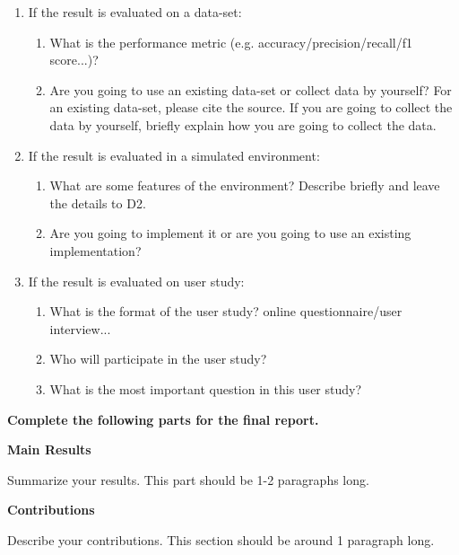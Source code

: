 \documentclass[letterpaper]{article} %
\begin{document}
\begin{enumerate}
  \item If the result is evaluated on a data-set:
    \begin{enumerate}
      \item What is the performance metric (e.g. accuracy/precision/recall/f1 score...)?
      \item Are you going to use an existing data-set or collect data by yourself? For an existing data-set, please cite the source. If you are going to collect the data by yourself, briefly explain how you are going to collect the data.
    \end{enumerate}
  \item If the result is evaluated in a simulated environment:
    \begin{enumerate}
      \item What are some features of the environment? Describe briefly and leave the details to D2. 
      \item Are you going to implement it or are you going to use an existing implementation?
      \end{enumerate}
    \item If the result is evaluated on user study:
        \begin{enumerate}
            \item What is the format of the user study? online questionnaire/user interview...
            \item Who will participate in the user study?  
            \item What is the most important question in this user study?
        \end{enumerate}
\end{enumerate}
 
{\bf Complete the following parts for the final report. }

{\bf Main Results}

Summarize your results. This part should be 1-2 paragraphs long.

{\bf Contributions}

Describe your contributions. This section should be around 1 paragraph long. 
\end{document}
